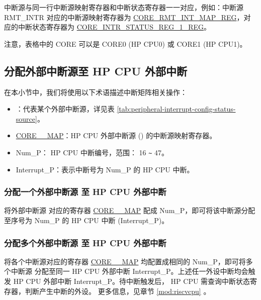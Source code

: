 \documentclass[main\_\_CN.tex]{subfiles}
\begin{document}
中断源与同一行中断源映射寄存器和中断状态寄存器一一对应，例如：中断源 RMT\_INTR 对应的中断源映射寄存器为 \hyperref[regdesc:CORE0RMTINTMAPREG]{CORE\_RMT\_INT\_MAP\_REG}，对应的中断状态寄存器为 \hyperref[regdesc:CORE0INTRSTATUSREG1REG]{CORE\_INTR\_STATUS\_REG\_1\_REG}。

注意，表格中的 CORE 可以是 CORE0 (HP CPU0) 或 CORE1 (HP CPU1)。



\clearpage
\begin{landscape}

\end{landscape}
\restoregeometry
\clearpage


\subsection{分配外部中断源至 HP CPU 外部中断}

在本小节中，我们将使用以下术语描述中断矩阵相关操作：

\begin{itemize}

\item {}：代表某个外部中断源，详见表 \ref{tab:peripheral-interrupt-config-status-source}。
\item \hyperref[fielddesc:CORE0SOURCEMAP]{CORE\_\_MAP}：HP CPU 外部中断源 () 的中断源映射寄存器。
\item Num\_P： HP CPU 中断编号，范围： 16 \verb+~+ 47。
\item Interrupt\_P：表示中断号为 Num\_P 的 HP CPU 中断。

\end{itemize}
\subsubsection{分配一个外部中断源  至 HP CPU 外部中断}

将外部中断源  对应的寄存器 \hyperref[fielddesc:CORE0SOURCEMAP]{CORE\_\_MAP} 配成 Num\_P，即可将该中断源分配至序号为 Num\_P 的 HP CPU 中断 (Interrupt\_P)。

\subsubsection{分配多个外部中断源  至 HP CPU 外部中断}
将各个中断源对应的寄存器 \hyperref[fielddesc:CORE0SOURCEMAP]{CORE\_\_MAP} 均配置成相同的 Num\_P，即可将多个中断源  分配至同一 HP CPU 外部中断 Interrupt\_P。上述任一外设中断均会触发 HP CPU 外部中断 Interrupt\_P。待中断触发后， HP CPU 需查询中断状态寄存器，判断产生中断的外设。 更多信息，见章节 \ref{mod:riscvcpu} \textit{}。
\end{document}
